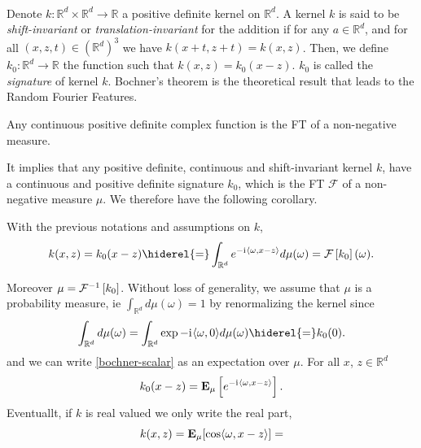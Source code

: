 \begin{Proposition}
\paragraph{}
Denote $k: \mathbb{R}^d \times \mathbb{R}^d \to \mathbb{R}$ a positive
definite kernel on $\mathbb{R}^d$. A kernel $k$ is said to be
\emph{shift-invariant} or \emph{translation-invariant} for the addition if for
any $a \in \mathbb{R}^d$, and for all $(x,z,t) \in \left(\mathbb{R}^d\right)^3$
we have $k(x+t,z+t) = k(x,z)$.  Then, we define $k_0: \mathbb{R}^d \to
\mathbb{R}$ the function such that $k(x,z)= k_0(x-z)$. $k_0$ is called the
\emph{signature} of kernel $k$. Bochner's theorem \cite{folland1994course} is
the theoretical result that leads to the Random Fourier Features.
\begin{theorem}\label{th:bochner-scalar}
    Any continuous positive definite complex function is the \acl{FT} of a
    non-negative measure.
\end{theorem}
It implies that any positive definite, continuous and shift-invariant kernel
$k$, have a continuous and positive definite signature $k_0$, which is the
\acl{FT} $\mathcal{F}$ of a non-negative measure $\mu$. We therefore have the
following corollary.
\begin{corollary}\label{c:bochner-app}
    With the previous notations and assumptions on $k$,
    \begin{dmath}\label{bochner-scalar}
        k(x,z)=k_0(x-z) \hiderel{=} \int_{\mathbb{R}^d} e^{-\iu \inner{\omega,x
        - z}} d\mu(\omega)
        =\FT{k_0}(\omega).
    \end{dmath}
\end{corollary}
Moreover $\mu = \mathcal{F}^{-1}\left[k_0\right]$.  Without loss of generality, we assume that $\mu$
is a probability measure, \acs{ie} $\int_{\mathbb{R}^d} d\mu(\omega)=1$ by
renormalizing the kernel since
\begin{dmath*}
    \int_{\mathbb{R}^d}d\mu(\omega)= \int_{\mathbb{R}^d}\exp{-\iu
    \inner{\omega, 0}}d\mu(\omega)\hiderel{=}k_0(0). 
\end{dmath*}
and we can write \cref{bochner-scalar} as an expectation over $\mu$. For all
$x$,
$z\in\mathbb{R}^d$
\begin{dmath*}
    k_0(x-z) = \expectation_{\mu}\left[e^{-\iu \inner{\omega,x - z}}\right].
\end{dmath*}
Eventuallt, if $k$ is real valued we only write the real part, 
\begin{dmath*}
    k(x,z) = \expectation_{\mu}[\cos \inner{\omega,x - z}] =

\end{dmath*}
\end{Proposition}

